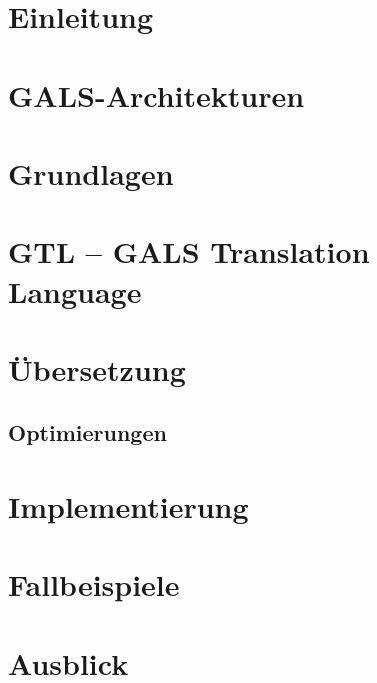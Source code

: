 \documentclass[
  10pt,
  a4paper,
  twoside,
  titlepage,
  headings=normal,
  bibliography=totoc,
  openright,
  abstract=on,
  cleardoublepage=current, %
  toc=listof
  ]{scrreprt}
\makeatletter
\newcommand{\@keywords}{}
\newcommand{\keywordsname}{Schlüsselwörter}
\makeatother
\begin{document}
\begin{abstract}
  \thispagestyle{headings}
  
  \\[5pt]
  {\bf \keywordsname :} \makeatletter\@keywords\makeatother
\end{abstract}
\cleardoublepage
{}
\tableofcontents
\listoffigures
\listoftables
\cleardoublepage
{}
\chapter{Einleitung}

\chapter{GALS-Architekturen}
\label{sec:gals}

\chapter{Grundlagen}
\label{sec:basics}






\chapter{GTL -- GALS Translation Language}
\label{sec:gtl}

\chapter{Übersetzung}
\label{sec:translation}




\section{Optimierungen}



\chapter{Implementierung}
\label{sec:implementation}

\chapter{Fallbeispiele}
\label{sec:case_studies}

\chapter{Ausblick}
\label{sec:conclusion}


\begin{appendix}
  
  
\end{appendix}
\end{document}
